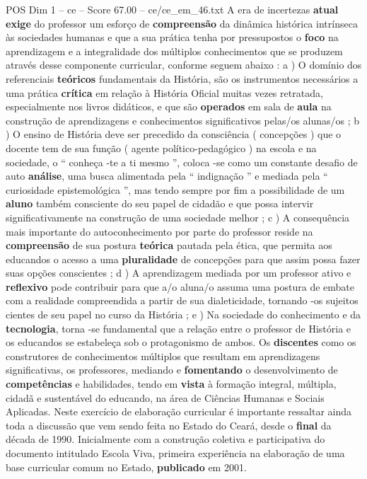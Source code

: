 \begin{textsample}{POS Dim 1 – ce – Score 67.00 – ce/ce\_em\_46.txt}
A era de incertezas \textbf{atual} \textbf{exige} do professor um esforço de \textbf{compreensão} da dinâmica histórica intrínseca às sociedades humanas e que a sua prática tenha por pressupostos o \textbf{foco} na aprendizagem e a integralidade dos múltiplos conhecimentos que se produzem através desse componente curricular, conforme seguem abaixo : a ) O domínio dos referenciais \textbf{teóricos} fundamentais da História, são os instrumentos necessários a uma prática \textbf{crítica} em relação à História Oficial muitas vezes retratada, especialmente nos livros didáticos, e que são \textbf{operados} em sala de \textbf{aula} na construção de aprendizagens e conhecimentos significativos pelas/os alunas/os ; b ) O ensino de História deve ser precedido da consciência ( concepções ) que o docente tem de sua função ( agente político-pedagógico ) na escola e na sociedade, o “ conheça -te a ti mesmo ”, coloca -se como um constante desafio de auto \textbf{análise}, uma busca alimentada pela “ indignação ” e mediada pela “ curiosidade epistemológica ”, mas tendo sempre por fim a possibilidade de um \textbf{aluno} também consciente do seu papel de cidadão e que possa intervir significativamente na construção de uma sociedade melhor ; c ) A consequência mais importante do autoconhecimento por parte do professor reside na \textbf{compreensão} de sua postura \textbf{teórica} pautada pela ética, que permita aos educandos o acesso a uma \textbf{pluralidade} de concepções para que assim possa fazer suas opções conscientes ; d ) A aprendizagem mediada por um professor ativo e \textbf{reflexivo} pode contribuir para que a/o aluna/o assuma uma postura de embate com a realidade compreendida a partir de sua dialeticidade, tornando -os sujeitos cientes de seu papel no curso da História ; e ) Na sociedade do conhecimento e da \textbf{tecnologia}, torna -se fundamental que a relação entre o professor de História e os educandos se estabeleça sob o protagonismo de ambos.
Os \textbf{discentes} como os construtores de conhecimentos múltiplos que resultam em aprendizagens significativas, os professores, mediando e \textbf{fomentando} o desenvolvimento de \textbf{competências} e habilidades, tendo em \textbf{vista} à formação integral, múltipla, cidadã e sustentável do educando, na área de Ciências Humanas e Sociais Aplicadas.
Neste exercício de elaboração curricular é importante ressaltar ainda toda a discussão que vem sendo feita no Estado do Ceará, desde o \textbf{final} da década de 1990.
Inicialmente com a construção coletiva e participativa do documento intitulado Escola Viva, primeira experiência na elaboração de uma base curricular comum no Estado, \textbf{publicado} em 2001.

\end{textsample}
